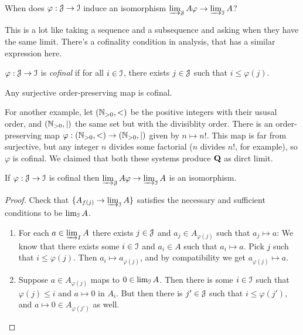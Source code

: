 \begin{question}
When does $\varphi:\mathcal J\to\mathcal I$ induce an isomorphism $\varinjlim_{\mathcal J}A\varphi\to\varinjlim_{\mathcal I}A$?
\end{question}
This is a lot like taking a sequence and a subsequence and asking when they have the same limit. There's a cofinality condition in analysis, that has a similar expression here.
\begin{definition}
$\varphi:\mathcal J\to\mathcal I$ is {\em cofinal} if for all $i\in\mathcal I$, there exists $j\in\mathcal J$ such that $i\leq\varphi(j)$.
\end{definition}
\begin{example}
Any surjective order-preserving map is cofinal. 

For another example, let $(\mathbb N_{>0},<)$ be the positive integers with their
ususal order, and $(\mathbb N_{>0},|)$ the same set but with the divisiblity order.
There is an order-preserving map $\varphi:(\mathbb N_{>0},<)\to(\mathbb N_{>0},|)$ given
by $n\mapsto n!$. This map is far from surjective, but any integer $n$ 
divides some factorial ($n$ divides $n!$, for example), so $\varphi$ is cofinal. 
We claimed that both these systems produce $\mathbf Q$ as dirct limit.
\end{example}
\begin{lemma}
If $\varphi:\mathcal J\to\mathcal I$ is cofinal then $\varinjlim_{\mathcal J}A\varphi\to\varinjlim_{\mathcal I}A$ is an isomorphism.
\end{lemma}
\begin{proof}
Check that $\{A_{f(j)}\to\varinjlim_{\mathcal I}A\}$ satisfies the necessary and sufficient conditions to be $\lim_{\mathcal I}A$.
\begin{enumerate}
\item For each $a\in\varinjlim_{I}A$ there exists $j\in\mathcal J$ and $a_j\in A_{\varphi(j)}$ such that $a_j\mapsto a$: We know that there exists some $i\in\mathcal I$ and $a_i\in A$ such that $a_i\mapsto a$. Pick $j$ such that $i\leq\varphi(j)$. Then $a_i\mapsto a_{\varphi(j)}$, and by compatibility we get $a_{\varphi(j)}\mapsto a$.
\item Suppose $a\in A_{\varphi(j)}$ maps to $0\in\lim_{\mathcal I}A$. Then there is
some $i\in\mathcal I$ such that $\varphi(j)\leq i$ and $a\mapsto0$ in $A_i$. 
But then there is $j'\in\mathcal J$ such that $i\leq\varphi(j')$, and 
$a\mapsto0\in A_{\varphi(j')}$ as well.
\end{enumerate}
\end{proof}

